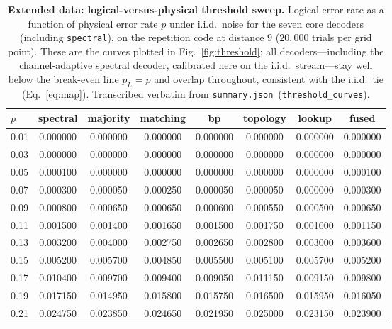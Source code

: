 \documentclass[reprint,aps,prxquantum,amsmath,amssymb,floatfix,nofootinbib,longbibliography]{revtex4-2}
\theoremstyle{definition}
\theoremstyle{remark}
\theoremstyle{plain}
\begin{document}
\begin{table}[tb]
    \centering
    \caption{\textbf{Extended data: logical-versus-physical threshold sweep.} Logical error rate as a function of physical error rate $p$ under i.i.d.\ noise for the seven core decoders (including \texttt{spectral}), on the repetition code at distance $9$ ($20{,}000$ trials per grid point). These are the curves plotted in Fig.~\ref{fig:threshold}; all decoders---including the channel-adaptive spectral decoder, calibrated here on the i.i.d.\ stream---stay well below the break-even line $p_L=p$ and overlap throughout, consistent with the i.i.d.\ tie (Eq.~\eqref{eq:map}). Transcribed verbatim from \texttt{summary.json}~(\texttt{threshold\_curves}).}
    \label{tab:ed_threshold}
\begin{tabular}{lccccccc}
\toprule
$p$ & spectral & majority & matching & bp & topology & lookup & fused \\
\midrule
0.01 & 0.000000 & 0.000000 & 0.000000 & 0.000000 & 0.000000 & 0.000000 & 0.000000 \\
0.03 & 0.000000 & 0.000000 & 0.000000 & 0.000000 & 0.000000 & 0.000000 & 0.000000 \\
0.05 & 0.000100 & 0.000000 & 0.000000 & 0.000000 & 0.000000 & 0.000000 & 0.000100 \\
0.07 & 0.000300 & 0.000050 & 0.000250 & 0.000050 & 0.000050 & 0.000000 & 0.000300 \\
0.09 & 0.000800 & 0.000650 & 0.000650 & 0.000600 & 0.000550 & 0.000500 & 0.000650 \\
0.11 & 0.001500 & 0.001400 & 0.001650 & 0.001500 & 0.001750 & 0.001000 & 0.001150 \\
0.13 & 0.003200 & 0.004000 & 0.002750 & 0.002650 & 0.002800 & 0.003000 & 0.003600 \\
0.15 & 0.005200 & 0.005700 & 0.004850 & 0.005500 & 0.005100 & 0.005700 & 0.005200 \\
0.17 & 0.010400 & 0.009700 & 0.009400 & 0.009050 & 0.011150 & 0.009150 & 0.009800 \\
0.19 & 0.017150 & 0.014950 & 0.015800 & 0.015750 & 0.016500 & 0.015950 & 0.016050 \\
0.21 & 0.024750 & 0.023850 & 0.024650 & 0.021950 & 0.025000 & 0.023150 & 0.023900 \\
\bottomrule
\end{tabular}
\end{table}
\end{document}
